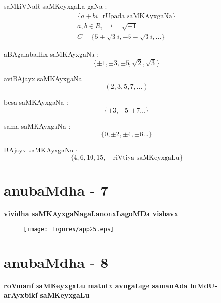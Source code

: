 \eject

saMkiVNaR saMKeyxgaLa gaNa : 
\begin{gather*}
\{a+bi\text{~~rUpada saMKAyxgaNa}\}\\[2pt]
a,b\in R,\quad i=\sqrt{-1}\\[2pt]
C=\{5+\sqrt{3}i,-5-\sqrt{3}i,\ldots\}
\end{gather*}

aBAgalabadhx saMKAyxgaNa : 
$$
\{\pm 1, \pm 3, \pm 5, \sqrt{2}, \sqrt{3}\}
$$

aviBAjayx saMKAyxgaNa \ \ 
$$
(2,3,5,7,\ldots)
$$

besa saMKAyxgaNa : 
$$
\{\pm 3, \pm 5, \pm 7\ldots\}
$$

sama saMKAyxgaNa : 
$$
\{0,\pm 2, \pm 4, \pm 6\ldots\}
$$

BAjayx saMKAyxgaNa : 
$$
\{4,6,10,15,\text{~~ riVtiya saMKeyxgaLu}\}
$$

\chapter{anubaMdha - 7}

\begin{center}
{\large\bf vividha saMKAyxgaNagaLanonxLagoMDa vishavx}
\smallskip

{\large\bf {}}
\end{center}

\begin{figure}[H]
\centering
\texttt{[image: figures/app25.eps]}
\end{figure}

\chapter{anubaMdha - 8}

\begin{center}
{\large\bf roVmanf saMKeyxgaLu matutx avugaLige samanAda hiMdU-arAyxbikf saMKeyxgaLu}
\smallskip

{\large\bf {}}
\end{center}

